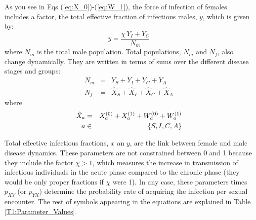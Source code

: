 \documentclass[preprint,12pt]{elsarticle}
\begin{document}
As you see in Eqs (\ref{eq:X_0})-(\ref{eq:W_1}), the force of infection of females includes a factor, the total effective fraction of infectious males, $y$, which is given by:
\begin{equation}
y = \frac{\chi\,Y_I + Y_C}{N_m}
\label{eq:y}
\end{equation}
where $N_m$ is the total male population. Total populations, $N_m$ and $N_f$, also change dynamically. They are written in terms of sums over the different disease stages and groups:
\begin{eqnarray}
N_m & = & Y_S + Y_I + Y_C + Y_A                        \nonumber\\
N_f & = & \hat{X}_S + \hat{X}_I + \hat{X}_C + \hat{X}_A
\label{eq:N}
\end{eqnarray}
where
\begin{eqnarray}
  	\hat{X}_a & = & X^{(0)}_a + X^{(1)}_a + W^{(0)}_a + W^{(1)}_a \nonumber\\
	        a & \in & \{{\tiny S, I, C, A}\} 
	\label{eq:X_hat}
\end{eqnarray}

Total effective infectious fractions, $x$ an $y$, are the link between female and male disease dynamics. These parameters are not constrained between 0 and 1 because they include the factor $\chi > 1$, which measures the increase in transmission of infectious individuals in the acute phase compared to the chronic phase (they would be only proper fractions if $\chi$ were 1). In any case, these parameters times $p_{XY}$ (or $p_{YX}$) determine the probability rate of acquiring the infection per sexual encounter. The rest of symbols appearing in the equations are explained in Table \ref{T1:Parameter_Values}.
\end{document}
